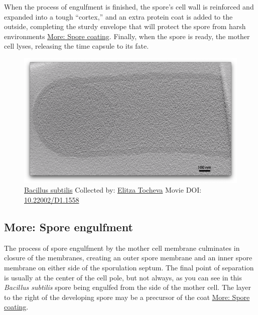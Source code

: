 \documentclass[]{tufte-book}
\begin{document}
When the process of engulfment is finished, the spore's cell wall is
reinforced and expanded into a tough ``cortex,'' and an extra protein
coat is added to the outside, completing the sturdy envelope that will
protect the spore from harsh environments
\protect\hyperlink{Spore_coating}{More: Spore coating}. Finally, when
the spore is ready, the mother cell lyses, releasing the time capsule to
its fate.





\begin{figure}
\includegraphics{movie_stills/8_6} \caption[\protect\hyperlink{tree}{Bacillus subtilis} Collected by:
\protect\hyperlink{elitza_tocheva}{Elitza Tocheva} Movie DOI:
\href{https://doi.org/10.22002/D1.1558}{10.22002/D1.1558}]{\protect\hyperlink{tree}{Bacillus subtilis} Collected by:
\protect\hyperlink{elitza_tocheva}{Elitza Tocheva} Movie DOI:
\href{https://doi.org/10.22002/D1.1558}{10.22002/D1.1558}}\label{fig:8-6}
\end{figure}

\hypertarget{Spore_engulfment}{\subsection*{More: Spore
engulfment}\label{Spore_engulfment}}

The process of spore engulfment by the mother cell membrane culminates
in closure of the membranes, creating an outer spore membrane and an
inner spore membrane on either side of the sporulation septum. The final
point of separation is usually at the center of the cell pole, but not
always, as you can see in this \emph{Bacillus subtilis} spore being
engulfed from the side of the mother cell. The layer to the right of the
developing spore may be a precursor of the coat
\protect\hyperlink{Spore_coating}{More: Spore coating}.
\end{document}
